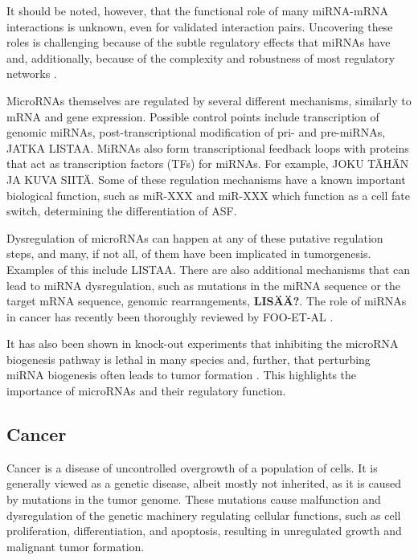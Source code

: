 It should be noted, however, that the functional role of many miRNA-mRNA
interactions is unknown, even for validated interaction pairs. Uncovering
these roles is challenging because of the subtle regulatory effects that
miRNAs have and, additionally, because of the complexity and robustness of most
regulatory networks \citep{Bartel2009}.

MicroRNAs themselves are regulated by several different mechanisms, similarly
to mRNA and gene expression. Possible control points include transcription of
genomic miRNAs, post-transcriptional modification of pri- and pre-miRNAs,
JATKA LISTAA. MiRNAs also form transcriptional feedback loops with proteins
that act as transcription factors (TFs) for miRNAs. For example, JOKU TÄHÄN JA
KUVA SIITÄ. Some of these regulation mechanisms have a known important
biological function, such as miR-XXX and miR-XXX which function as a cell fate
switch, determining the differentiation of ASF.

Dysregulation of microRNAs can happen at any of these putative regulation
steps, and many, if not all, of them have been implicated in tumorgenesis.
Examples of this include LISTAA. There are also additional mechanisms that can
lead to miRNA dysregulation, such as mutations in the miRNA sequence or the
target mRNA sequence, genomic rearrangements,
\textbf{LISÄÄ?}. The role of miRNAs in cancer has recently been
thoroughly reviewed by FOO-ET-AL \citep{CITE}.

It has also been shown in knock-out experiments that inhibiting the microRNA
biogenesis pathway is lethal in many species \citep{CITE} and, further, that
perturbing miRNA biogenesis often leads to tumor formation \citep{CITE}. This
highlights the importance of microRNAs and their regulatory function.












\subsection{Cancer}\label{cancer}

Cancer is a disease of uncontrolled overgrowth of a population of cells. It is
generally viewed as a genetic disease, albeit mostly not inherited, as it is
caused by  mutations in the tumor genome. These mutations cause malfunction
and dysregulation of the genetic machinery regulating cellular functions, such
as cell proliferation, differentiation, and apoptosis, resulting in
unregulated growth and malignant tumor formation.

